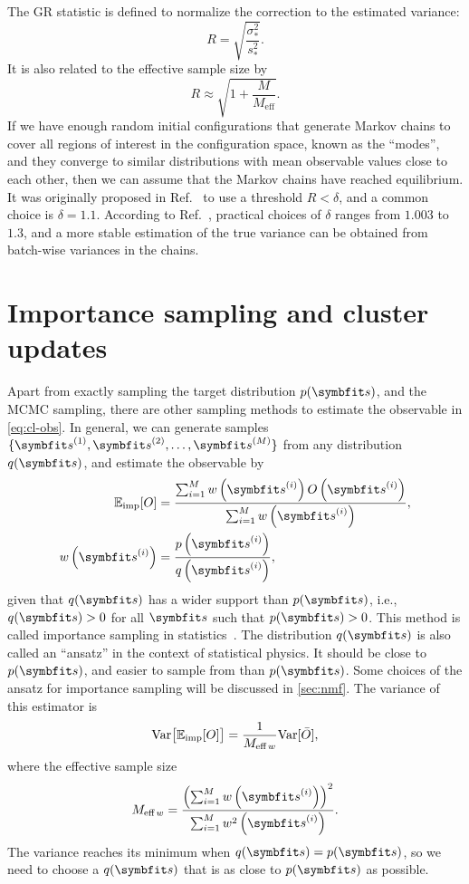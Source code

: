 The GR statistic is defined to normalize the correction to the estimated variance:
\begin{equation}
R = \sqrt{\frac{\sigma^2_*}{s^2_*}}.
\end{equation}
It is also related to the effective sample size by
\begin{equation}
R \approx \sqrt{1 + \frac{M}{M_\text{eff}}}.
\end{equation}
If we have enough random initial configurations that generate Markov chains to cover all regions of interest in the configuration space, known as the ``modes'', and they converge to similar distributions with mean observable values close to each other, then we can assume that the Markov chains have reached equilibrium. It was originally proposed in Ref.~\cite{gelman1992inference} to use a threshold $R < \delta$, and a common choice is $\delta = 1.1$. According to Ref.~\cite{vats2021revisiting}, practical choices of $\delta$ ranges from $1.003$ to $1.3$, and a more stable estimation of the true variance can be obtained from batch-wise variances in the chains.

\section{Importance sampling and cluster updates}
\label{sec:importance-sampling}

Apart from exactly sampling the target distribution $p(\vs)$, and the MCMC sampling, there are other sampling methods to estimate the observable in \cref{eq:cl-obs}. In general, we can generate samples $\{\vs^{(1)}, \vs^{(2)}, \ldots, \vs^{(M)}\}$ from any distribution $q(\vs)$, and estimate the observable by
\begin{align}
\bbE_\text{imp}[O] &= \frac{\sum_{i = 1}^M w\left( \vs^{(i)} \right) O\left( \vs^{(i)} \right)}{\sum_{i = 1}^M w\left( \vs^{(i)} \right)}, \label{eq:importance-sampling} \\
w\left( \vs^{(i)} \right) &= \frac{p\left( \vs^{(i)} \right)}{q\left(\vs^{(i)} \right)},
\end{align}
given that $q(\vs)$ has a wider support than $p(\vs)$, i.e., $q(\vs) > 0$ for all $\vs$ such that $p(\vs) > 0$. This method is called importance sampling in statistics~\cite{kloek1978bayesian, bugallo2017adaptive}. The distribution $q(\vs)$ is also called an ``ansatz'' in the context of statistical physics. It should be close to $p(\vs)$, and easier to sample from than $p(\vs)$. Some choices of the ansatz for importance sampling will be discussed in \cref{sec:nmf}. The variance of this estimator is
\begin{equation}
\mathrm{Var}\big[ \mathbb{E}_\text{imp}[O] \big] = \frac{1}{M_{\text{eff}\,w}} \mathrm{Var}[\bar{O}],
\label{eq:importance-sampling-var}
\end{equation}
where the effective sample size
\begin{equation}
M_{\text{eff}\,w} = \frac{\left( \sum_{i = 1}^M w\left( \vs^{(i)} \right) \right)^2}{\sum_{i = 1}^M w^2\left( \vs^{(i)} \right)}.
\end{equation}
The variance reaches its minimum when $q(\vs) = p(\vs)$, so we need to choose a $q(\vs)$ that is as close to $p(\vs)$ as possible.

